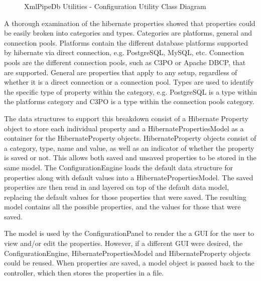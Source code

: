 \begin{figure}[placement]
\begin{center}
\caption{XmlPipeDb Utilities - Configuration Utility Class Diagram}
\label{configutilclassdiagram}
\end{center}
\end{figure}

A thorough examination of the hibernate properties showed that properties could be easily broken into categories and types. Categories are platforms, general and connection pools. Platforms contain the different database platforms supported by hibernate via direct connection, e.g. PostgreSQL, MySQL, etc. Connection pools are the different connection pools, such as C3PO or Apache DBCP, that are supported. General are properties that apply to any setup, regardless of whether it is a direct connection or a connection pool. Types are used to identify the specific type of property within the category, e.g. PostgreSQL is a type within the platforms category and C3PO is a type within the connection pools category.

The data structures to support this breakdown consist of a Hibernate Property object to store each individual property and a HibernatePropertiesModel as a container for the HibernateProperty objects. HibernateProperty objects consist of a category, type, name and value, as well as an indicator of whether the property is saved or not. This allows both saved and unsaved properties to be stored in the same model. The ConfigurationEngine loads the default data structure for properties along with default values into a HibernatePropertiesModel. The saved properties are then read in and layered on top of the default data model, replacing the default values for those properties that were saved. The resulting model contains all the possible properties, and the values for those that were saved. 

The model is used by the ConfigurationPanel to render the a GUI for the user to view and/or edit the properties. However, if a different GUI were desired, the  ConfigurationEngine, HibernatePropertiesModel and HibernateProperty objects could be reused. When properties are saved, a model object is passed back to the controller, which then stores the properties in a file.

